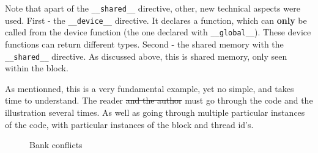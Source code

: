 \documentclass[12pt]{article}
\begin{document}
   Note that apart of the \verb|__shared__| directive, other, new technical aspects were used. First - the \verb|__device__| directive.
   It declares a function, which can \textbf{only} be called from the device function (the one declared with \verb|__global__|). These device functions 
   can return different types. Second - the shared memory with the \verb|__shared__| directive. As discussed above, this is shared memory, only seen within the block.
    

   As mentionned, this is a very fundamental example, yet no simple, and takes time to understand. The reader \sout{and the author} must go through the code 
   and the illustration several times. As well as going through multiple particular instances of the code, with particular instances of the block and thread id's.


\begin{figure}[h!]
   \centering
   \qquad
   \caption{Bank conflicts}
   \label{fig:bankconflicts2}
\end{figure}
\end{document}
